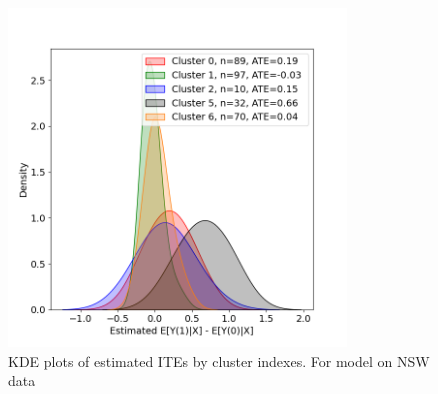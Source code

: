 \documentclass{article}
\begin{document}
\begin{figure}[H]
  \centering
  \includegraphics[width=0.8\textwidth]{Plots/NSW_output_histogram.png}
  \caption{KDE plots of estimated ITEs by cluster indexes. For model on NSW data}
  \label{fig:nsw_histo}
\end{figure}


\printbibliography
\end{document}
